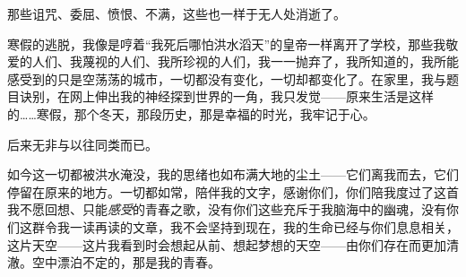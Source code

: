 \documentclass{ctexbook}
\begin{document}
    那些诅咒、委屈、愤恨、不满，这些也一样于无人处消逝了。

    寒假的逃脱，我像是哼着“我死后哪怕洪水滔天”的皇帝一样离开了学校，那些我敬爱的人们、我蔑视的人们、我所珍视的人们，我一一抛弃了，我所知道的，我所能感受到的只是空荡荡的城市，一切都没有变化，一切却都变化了。在家里，我与题目诀别，在网上伸出我的神经探到世界的一角，我只发觉——原来生活是这样的……寒假，那个冬天，那段历史，那是幸福的时光，我牢记于心。

    后来无非与以往同类而已。

    如今这一切都被洪水淹没，我的思绪也如布满大地的尘土——它们离我而去，它们停留在原来的地方。一切都如常，陪伴我的文字，感谢你们，你们陪我度过了这首我不愿回想、只能\emph{感受}的青春之歌，没有你们这些充斥于我脑海中的幽魂，没有你们这群令我一读再读的文章，我不会坚持到现在，我的生命已经与你们息息相关，这片天空——这片我看到时会想起从前、想起梦想的天空——由你们存在而更加清澈。空中漂泊不定的，那是我的青春。
\end{document}
